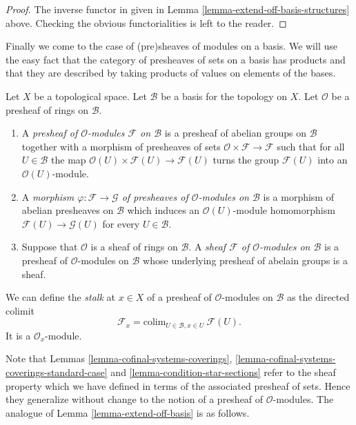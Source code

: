 \begin{proof}
The inverse functor in given in
Lemma \ref{lemma-extend-off-basis-structures} above.
Checking the obvious functorialities is left to the
reader.
\end{proof}


\medskip\noindent
Finally we come to the case of (pre)sheaves of modules
on a basis. We will use the easy fact that the category
of presheaves of sets on a basis has products and that
they are described by taking products of values on
elements of the bases.

\begin{definition}
\label{definition-sheaf-modules-basis}
Let $X$ be a topological space. Let $\mathcal{B}$ be a
basis for the topology on $X$. Let $\mathcal{O}$ be
a presheaf of rings on $\mathcal{B}$.
\begin{enumerate}
\item A {\it presheaf of $\mathcal{O}$-modules $\mathcal{F}$
on $\mathcal{B}$} is a presheaf of abelian groups on
$\mathcal{B}$ together with a morphism of presheaves
of sets $\mathcal{O} \times \mathcal{F} \to \mathcal{F}$
such that for all $U \in \mathcal{B}$ the map
$\mathcal{O}(U) \times \mathcal{F}(U) \to \mathcal{F}(U)$
turns the group $\mathcal{F}(U)$ into an $\mathcal{O}(U)$-module.
\item A {\it morphism $\varphi : \mathcal{F} \to \mathcal{G}$ 
of presheaves of $\mathcal{O}$-modules on $\mathcal{B}$}
is a morphism of abelian presheaves on $\mathcal{B}$
which induces an $\mathcal{O}(U)$-module homomorphism
$\mathcal{F}(U) \to \mathcal{G}(U)$ for every $U \in \mathcal{B}$.
\item Suppose that $\mathcal{O}$ is a sheaf of rings
on $\mathcal{B}$. A {\it sheaf $\mathcal{F}$ of $\mathcal{O}$-modules
on $\mathcal{B}$} is a presheaf of $\mathcal{O}$-modules
on $\mathcal{B}$ whose underlying presheaf of abelain groups
is a sheaf.
\end{enumerate}
\end{definition}

\noindent
We can define the {\it stalk} at $x \in X$
of a presheaf of $\mathcal{O}$-modules on $\mathcal{B}$
as the directed colimit
$$
\mathcal{F}_x = \text{colim}_{U\in \mathcal{B}, x\in U}\ \mathcal{F}(U).
$$
It is a $\mathcal{O}_x$-module.

\medskip\noindent
Note that Lemmas \ref{lemma-cofinal-systems-coverings},
\ref{lemma-cofinal-systems-coverings-standard-case} and
\ref{lemma-condition-star-sections} refer to the sheaf
property which we have defined in terms of the associated presheaf
of sets. Hence they generalize without change to the notion
of a presheaf of $\mathcal{O}$-modules. The analogue of
Lemma \ref{lemma-extend-off-basis} is as follows.

